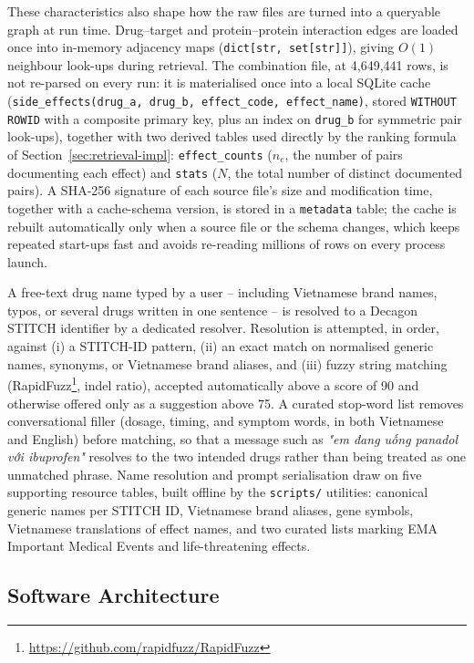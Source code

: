 These characteristics also shape how the raw files are turned into a
queryable graph at run time. Drug--target and protein--protein interaction
edges are loaded once into in-memory adjacency maps
(\texttt{dict[str, set[str]]}), giving $O(1)$ neighbour look-ups during
retrieval. The combination file, at 4{,}649{,}441 rows, is not re-parsed on
every run: it is materialised once into a local SQLite cache
(\texttt{side\_effects(drug\_a, drug\_b, effect\_code, effect\_name)},
stored \texttt{WITHOUT ROWID} with a composite primary key, plus an index on
\texttt{drug\_b} for symmetric pair look-ups), together with two derived
tables used directly by the ranking formula of
Section~\ref{sec:retrieval-impl}: \texttt{effect\_counts} ($n_e$, the number
of pairs documenting each effect) and \texttt{stats} ($N$, the total number
of distinct documented pairs). A SHA-256 signature of each source file's
size and modification time, together with a cache-schema version, is stored
in a \texttt{metadata} table; the cache is rebuilt automatically only when a
source file or the schema changes, which keeps repeated start-ups fast and
avoids re-reading millions of rows on every process launch.

A free-text drug name typed by a user -- including Vietnamese brand names,
typos, or several drugs written in one sentence -- is resolved to a Decagon
STITCH identifier by a dedicated resolver. Resolution is attempted, in
order, against (i) a STITCH-ID pattern, (ii) an exact match on normalised
generic names, synonyms, or Vietnamese brand aliases, and (iii) fuzzy string
matching (RapidFuzz\footnote{\url{https://github.com/rapidfuzz/RapidFuzz}},
indel ratio), accepted automatically above a score of 90 and otherwise
offered only as a suggestion above 75. A curated stop-word list removes
conversational filler (dosage, timing, and symptom words, in both
Vietnamese and English) before matching, so that a message such as
\emph{"em đang uống panadol với ibuprofen"} resolves to the two intended
drugs rather than being treated as one unmatched phrase. Name resolution
and prompt serialisation draw on five supporting resource tables, built
offline by the \texttt{scripts/} utilities: canonical generic names per
STITCH ID, Vietnamese brand aliases, gene symbols, Vietnamese translations
of effect names, and two curated lists marking EMA Important Medical
Events and life-threatening effects.

\subsection{Software Architecture}
\label{sec:architecture}

